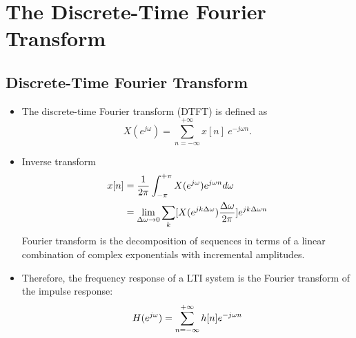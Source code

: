 \section{The Discrete-Time Fourier Transform}
\subsection{Discrete-Time Fourier Transform}
\begin{itemize}
    \item The discrete-time Fourier transform (DTFT) is defined as
    \begin{equation} \label{eqn:dtft}
        X(e^{j\omega}) = \sum_{n=-\infty}^{+\infty} x[n] \ e^{-j\omega n}.
    \end{equation}

    \item Inverse transform
    \begin{align}
        x[n] 
        &= \frac{1}{2\pi} \int_{-\pi}^{+\pi} X(e^{j\omega}) e^{j\omega n} d\omega \\
        &= \lim_{\Delta \omega \to 0} \sum_{k} [X(e^{jk\Delta \omega})\frac{\Delta \omega}{2\pi}]e^{jk\Delta \omega n}
    \end{align}
    Fourier transform is the decomposition of sequences in terms of a linear combination of complex exponentials with incremental amplitudes.

    \item Therefore, the frequency response of a LTI system is the Fourier transform of the impulse response:
    \begin{equation}
        H(e^{j\omega}) = \sum_{n=-\infty}^{+\infty} h[n] e^{-j\omega n}
    \end{equation}
\end{itemize}

